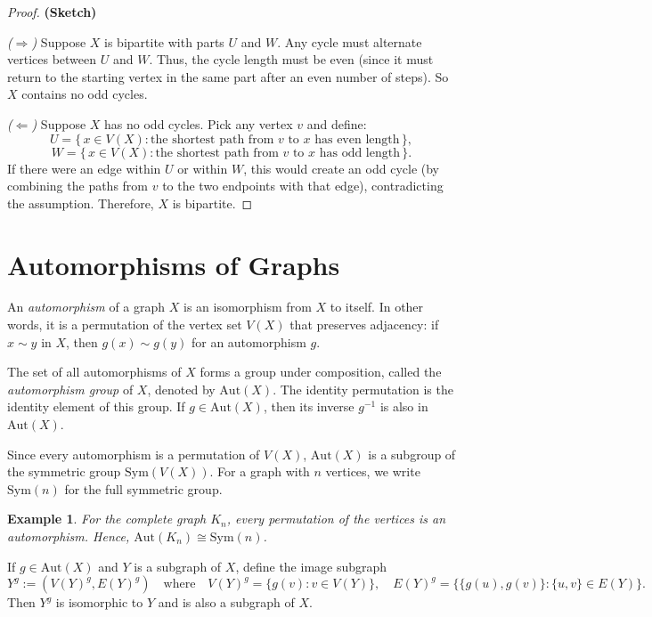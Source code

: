 \documentclass[12pt,a4paper,openany]{book}
\newtheorem{example}{Example}[section]
\begin{document}
\begin{proof}
\textbf{(Sketch)}

\textit{($\Rightarrow$)} Suppose $X$ is bipartite with parts $U$ and $W$.  
Any cycle must alternate vertices between $U$ and $W$.  
Thus, the cycle length must be even (since it must return to the starting vertex in the same part after an even number of steps).  
So $X$ contains no odd cycles.

\textit{($\Leftarrow$)} Suppose $X$ has no odd cycles.  
Pick any vertex $v$ and define:
\[
U = \{\,x \in V(X) : \text{the shortest path from } v \text{ to } x \text{ has even length}\,\}, 
\]
\[
W = \{\,x \in V(X) : \text{the shortest path from } v \text{ to } x \text{ has odd length}\,\}.
\]
If there were an edge within $U$ or within $W$, this would create an odd cycle (by combining the paths from $v$ to the two endpoints with that edge), contradicting the assumption.  
Therefore, $X$ is bipartite.
\end{proof}




\section{Automorphisms of Graphs}

An \emph{automorphism} of a graph \(X\) is an isomorphism from \(X\) to itself.  
In other words, it is a permutation of the vertex set \(V(X)\) that preserves adjacency: if \(x \sim y\) in \(X\), then \(g(x) \sim g(y)\) for an automorphism \(g\).

The set of all automorphisms of \(X\) forms a group under composition, called the \emph{automorphism group} of \(X\), denoted by \(\mathrm{Aut}(X)\).  
The identity permutation is the identity element of this group.  
If \(g \in \mathrm{Aut}(X)\), then its inverse \(g^{-1}\) is also in \(\mathrm{Aut}(X)\).

Since every automorphism is a permutation of \(V(X)\), \(\mathrm{Aut}(X)\) is a subgroup of the symmetric group \(\mathrm{Sym}(V(X))\).  
For a graph with \(n\) vertices, we write \(\mathrm{Sym}(n)\) for the full symmetric group.

\begin{example}
For the complete graph \(K_n\), every permutation of the vertices is an automorphism.  
Hence, \(\mathrm{Aut}(K_n) \cong \mathrm{Sym}(n)\).
\end{example}

If \(g \in \mathrm{Aut}(X)\) and \(Y\) is a subgraph of \(X\), define the image subgraph
\[
Y^g := (V(Y)^g, E(Y)^g) \quad \text{where} \quad V(Y)^g = \{g(v) : v \in V(Y)\}, \quad E(Y)^g = \{ \{g(u), g(v)\} : \{u,v\} \in E(Y) \}.
\]
Then \(Y^g\) is isomorphic to \(Y\) and is also a subgraph of \(X\).
\end{document}
